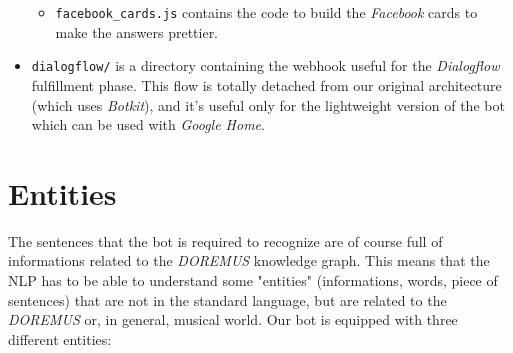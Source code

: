 \begin{itemize}
\begin{itemize}
			\item \texttt{facebook\_cards.js} contains the code to build the \textit{Facebook} cards to make the answers prettier.
			\end{itemize}
		\item \texttt{dialogflow/} is a directory containing the webhook useful for the \textit{Dialogflow} fulfillment phase. This flow is totally detached from our original architecture (which uses \textit{Botkit}), and it's useful only for the lightweight version of the bot which can be used with \textit{Google Home}.
	\end{itemize}
	
	\section{Entities}
	The sentences that the bot is required to recognize are of course full of informations related to the \textit{DOREMUS} knowledge graph. This means that the NLP has to be able to understand some "entities" (informations, words, piece of sentences) that are not in the standard language, but are related to the \textit{DOREMUS} or, in general, musical world. Our bot is equipped with three different entities:
